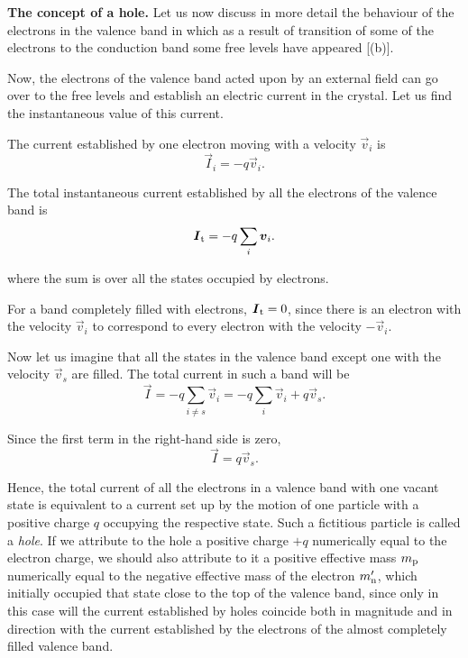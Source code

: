 \textbf{The concept of a hole.} Let us now discuss in more detail the behaviour of the electrons in the valence band in which as a result of transition of some of the electrons to the conduction band some free levels have appeared [(b)].

Now, the electrons of the valence band acted upon by an external field can go over to the free levels and establish an electric current in the crystal. Let us find the instantaneous value of this current.

The current established by one electron moving with a velocity $\vec{v}_i$ is
\begin{equation*}
    \vec{I}_i = -q \vec{v}_i.
\end{equation*}

\noindent
The total instantaneous current established by all the electrons of the valence band is
\begin{equation*}
    \boldsymbol{I}_{\text{t}} = -q \sum_i \boldsymbol{v}_i.
\end{equation*}

\noindent
where the sum is over all the states occupied by electrons.

For a band completely filled with electrons, $\boldsymbol{I}_{\text{t}}=0$, since there is an electron with the velocity $\vec{v}_i$ to correspond to every electron with the velocity $-\vec{v}_i$.

Now let us imagine that all the states in the valence band except one with the velocity $\vec{v}_s$ are filled. The total current in such a band will be
\begin{equation*}
    \vec{I} = -q \sum_{i\neq s}\vec{v}_i = -q \sum_i \vec{v}_i + q \vec{v}_s.
\end{equation*}

\noindent
Since the first term in the right-hand side is zero,
\begin{equation}\label{eq:5_28}
    \vec{I} = q \vec{v}_s.
\end{equation}

Hence, the total current of all the electrons in a valence band with one vacant state is equivalent to a current set up by the motion of one particle with a positive charge $q$ occupying the respective state. Such a fictitious particle is called a \textit{hole}. If we attribute to the hole a positive charge $+q$ numerically equal to the electron charge, we should also attribute to it a positive effective mass $m_{\text{p}}$ numerically equal to the negative effective mass of the electron $m_{\text{n}}'$, which initially occupied that state close to the top of the valence band, since only in this case will the current established by holes coincide both in magnitude and in direction with the current established by the electrons of the almost completely filled valence band.

